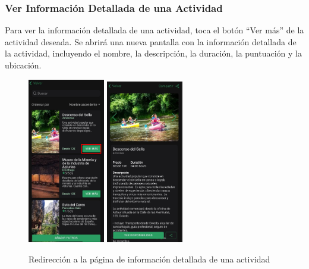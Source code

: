 \subsubsection{Ver Información Detallada de una Actividad}
Para ver la información detallada de una actividad, toca el botón “Ver más” de la actividad deseada.
Se abrirá una nueva pantalla con la información detallada de la actividad, incluyendo el nombre, la descripción, la duración, la puntuación y la ubicación.
\begin{figure}[H]
	\centering
	\includegraphics[width=0.3\textwidth]{7-Construccion/Manuales/app/P1-Actividad.png}
	\includegraphics[width=0.3\textwidth]{7-Construccion/Manuales/app/P2-Actividad.png}
	\caption{Redirección a la página de información detallada de una actividad}
\end{figure}

